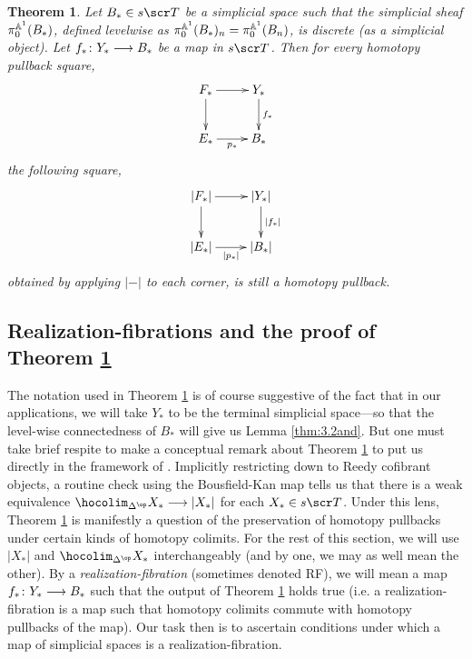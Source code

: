 \documentclass{amsart}
\newtheorem{thm}{Theorem}[section]
\theoremstyle{definition}
\begin{document}
\begin{thm}\label{thm:rezk}
    Let $B_* \in s\sT$ be a simplicial space such that the simplicial sheaf $\pi_0^{\mathbb{A}^1}(B_*)$, defined levelwise as $\pi_0^{\mathbb{A}^1}(B_*)_n = \pi_0^{\mathbb{A}^1} (B_n)$, is discrete (as a simplicial object). Let $f_* \colon Y_* \longrightarrow B_*$ be a map in $s\sT$.
    Then for every homotopy pullback square, 
    \[
    \xymatrix{
        F_* \ar[r] \ar[d] & Y_* \ar[d]^{f_*}\\
        E_* \ar[r]_{p_*} & B_*
    }
    \]
    the following square,
    \[
    \xymatrix{
        |F_*| \ar[r] \ar[d] & |Y_*| \ar[d]^{|f_*|}\\
        |E_*| \ar[r]_{|p_*|} & |B_*|
    }
    \]
    obtained by applying $|-|$ to each corner, is still a homotopy pullback.
\end{thm}

\subsection{Realization-fibrations and the proof of Theorem \ref{thm:rezk}}\label{subsec:rf}

The notation used in Theorem \ref{thm:rezk} is of course suggestive of the fact that in our applications, we will take $Y_*$ to be the terminal simplicial space---so that the level-wise connectedness of $B_*$ will give us Lemma \ref{thm:3.2and}.
But one must take brief respite to make a conceptual remark about Theorem \ref{thm:rezk} to put us directly in the framework of \cite{Rezk14}. Implicitly restricting down to Reedy cofibrant objects, a routine check using the Bousfield-Kan map tells us that there is a weak equivalence $\hocolim_{\DE^{\op}} X_* \rtarr |X_*|$ for each $X_* \in s\sT$.
Under this lens, Theorem \ref{thm:rezk} is manifestly a question of the preservation of homotopy pullbacks under certain kinds of homotopy colimits. For the rest of this section, we will use $|X_*|$ and $\hocolim_{\DE^{\op}}X_*$ interchangeably (and by one, we may as well mean the other). By a \emph{realization-fibration} (sometimes denoted RF), we will mean a map $f_* \colon Y_* \longrightarrow B_*$ such that
the output of Theorem \ref{thm:rezk} holds true (i.e. a realization-fibration is a map such that homotopy colimits commute with homotopy pullbacks of the map). Our task then is to ascertain conditions under which a map of simplicial spaces is a realization-fibration.\\
\end{document}
